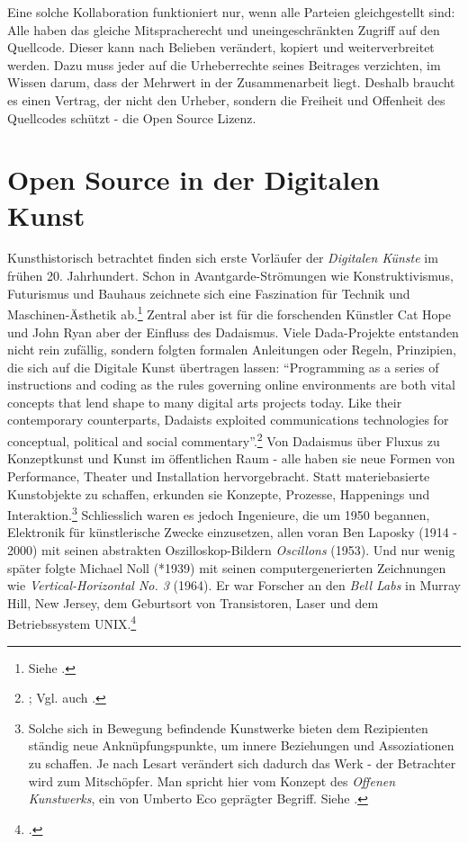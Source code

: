 \documentclass[
paper=164mm:234mm, %
pagesize, %
DIV=calc, %
10pt, %
BCOR=0mm, %
parskip=half- %
]{scrbook}
\begin{document}
Eine solche Kollaboration funktioniert nur, wenn alle Parteien gleichgestellt sind: Alle haben das gleiche Mitspracherecht und uneingeschränkten Zugriff auf den Quellcode. Dieser kann nach Belieben verändert, kopiert und weiterverbreitet werden. Dazu muss jeder auf die Urheberrechte seines Beitrages verzichten, im Wissen darum, dass der Mehrwert in der Zusammenarbeit liegt. Deshalb braucht es einen Vertrag, der nicht den Urheber, sondern die Freiheit und Offenheit des Quellcodes schützt - die Open Source Lizenz.


{}
\chapter*{Open Source in der Digitalen Kunst}

Kunsthistorisch betrachtet finden sich erste Vorläufer der \emph{Digitalen Künste} im frühen 20. Jahrhundert. Schon in Avantgarde-Strömungen wie Konstruktivismus, Futurismus und Bauhaus zeichnete sich eine Faszination für Technik und Maschinen-Ästhetik ab.\footnote{Siehe \cite[39]{Hope-Ryan:2014}.} Zentral aber ist für die forschenden Künstler Cat Hope und John Ryan aber der Einfluss des Dadaismus. Viele Dada-Projekte entstanden nicht rein zufällig, sondern folgten formalen Anleitungen oder Regeln, Prinzipien, die sich auf die Digitale Kunst übertragen lassen: \enquote{Programming as a series of instructions and coding as the rules governing online environments are both vital concepts that lend shape to many digital arts projects today. Like their contemporary counterparts, Dadaists exploited communications technologies for conceptual, political and social commentary}.\footnote{\cite[40]{Hope-Ryan:2014}; Vgl. auch \cite{Taylor:2014}.} Von Dadaismus über Fluxus zu Konzeptkunst und Kunst im öffentlichen Raum - alle haben sie neue Formen von Performance, Theater und Installation hervorgebracht. Statt materiebasierte Kunstobjekte zu schaffen, erkunden sie Konzepte, Prozesse, Happenings und Interaktion.\footnote{Solche sich in Bewegung befindende Kunstwerke bieten dem Rezipienten ständig neue Anknüpfungspunkte, um innere Beziehungen und Assoziationen zu schaffen. Je nach Lesart verändert sich dadurch das Werk - der Betrachter wird zum Mitschöpfer. Man spricht hier vom Konzept des \emph{Offenen Kunstwerks}, ein von Umberto Eco geprägter Begriff. Siehe \cite{Eco:1973}.} Schliesslich waren es jedoch Ingenieure, die um 1950 begannen, Elektronik für künstlerische Zwecke einzusetzen, allen voran Ben Laposky (1914 - 2000) mit seinen abstrakten Oszilloskop-Bildern \emph{Oscillons} (1953). Und nur wenig später folgte Michael Noll (*1939) mit seinen computergenerierten Zeichnungen wie \emph{Vertical-Horizontal No. 3} (1964). Er war Forscher an den \emph{Bell Labs} in Murray Hill, New Jersey, dem Geburtsort von Transistoren, Laser und dem Betriebssystem UNIX.\footnote{\cite[24]{Wands:2006}.}
\end{document}
